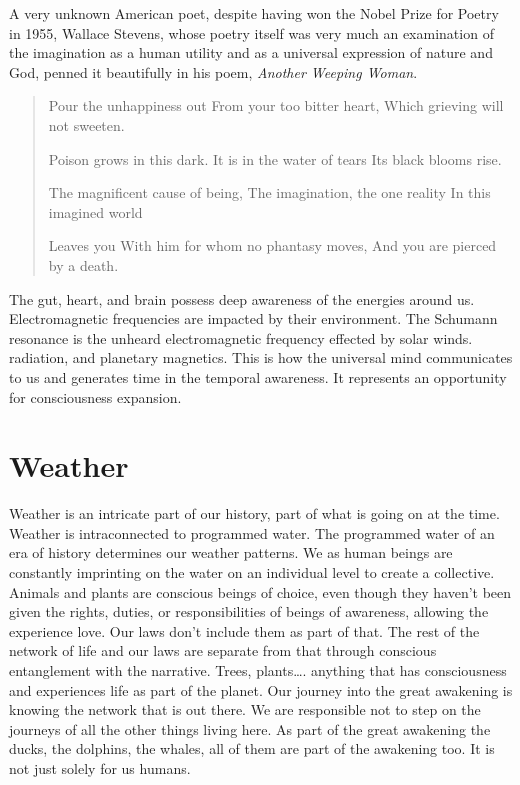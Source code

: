 \documentclass[letterpaper,9pt,twoside,titlepage,onecolumn,openany]{book}
\begin{document}
A very unknown American poet, despite having won the Nobel Prize for
Poetry in 1955, Wallace Stevens, whose poetry itself was very much an
examination of the imagination as a human utility and as a universal
expression of nature and God, penned it beautifully in his poem,
\emph{Another Weeping Woman}.

\begin{quote}
Pour the unhappiness out
From your too bitter heart,
Which grieving will not sweeten.

Poison grows in this dark.
It is in the water of tears
Its black blooms rise.

The magnificent cause of being,
The imagination, the one reality
In this imagined world

Leaves you
With him for whom no phantasy moves,
And you are pierced by a death.
\end{quote}

The gut, heart, and brain possess deep awareness of the energies around
us. Electromagnetic frequencies are impacted by their environment. The
Schumann resonance is the unheard electromagnetic frequency effected by
solar winds. radiation, and planetary magnetics. This is how the
universal mind communicates to us and generates time in the temporal
awareness. It represents an opportunity for consciousness expansion.

\section*{Weather}\label{weather}

Weather is an intricate part of our history, part of what is going on at
the time. Weather is intraconnected to programmed water. The programmed
water of an era of history determines our weather patterns. We as human
beings are constantly imprinting on the water on an individual level to
create a collective. Animals and plants are conscious beings of choice,
even though they haven't been given the rights, duties, or
responsibilities of beings of awareness, allowing the experience love.
Our laws don't include them as part of that. The rest of the network of
life and our laws are separate from that through conscious entanglement
with the narrative. Trees, plants\ldots{}. anything that has
consciousness and experiences life as part of the planet. Our journey
into the great awakening is knowing the network that is out there. We
are responsible not to step on the journeys of all the other things
living here. As part of the great awakening the ducks, the dolphins, the
whales, all of them are part of the awakening too. It is not just solely
for us humans.
\end{document}
